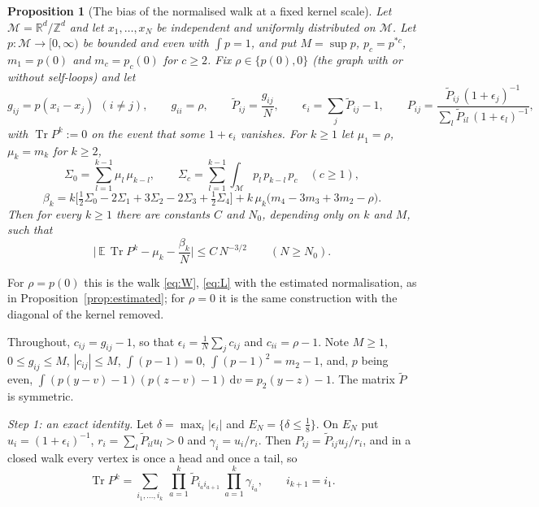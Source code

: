 \documentclass[11pt,a4paper]{article}
\makeatletter
\theoremstyle{stmt}
\newtheorem{proposition}[theorem]{Proposition}
\theoremstyle{defn}
\theoremstyle{rmk}
\renewenvironment{proof}[1][\proofname]{\par\pushQED{\qed}\normalfont\topsep6\p@\@plus6\p@\relax
  \trivlist\item[\hskip\labelsep{\sffamily\itshape\small #1.}]\ignorespaces}{\popQED\endtrivlist\@endpefalse}
\numberwithin{equation}{section}
\DeclareMathOperator{\Tr}{Tr}
\newcommand{\M}{\mathcal{M}}
\newcommand{\R}{\mathbb{R}}
\newcommand{\dd}{\mathrm{d}}
\makeatother
\begin{document}
{\begin{proposition}[The bias of the normalised walk at a fixed kernel scale]\label{prop:bias}
Let $\M=\R^d/\mathbb Z^d$ and let $x_1,\dots,x_N$ be independent and uniformly distributed on $\M$. Let $p\colon\M\to[0,\infty)$ be bounded and even with $\int p=1$, and put $M=\sup p$, $p_c=p^{*c}$, $m_1=p(0)$ and $m_c=p_c(0)$ for $c\ge2$. Fix $\rho\in\{p(0),0\}$ (the graph with or without self-loops) and let
\[
g_{ij}=p(x_i-x_j)\ \ (i\ne j),\qquad g_{ii}=\rho,\qquad\tilde P_{ij}=\frac{g_{ij}}N,\qquad\epsilon_i=\sum_j\tilde P_{ij}-1,\qquad P_{ij}=\frac{\tilde P_{ij}\,(1+\epsilon_j)^{-1}}{\sum_l\tilde P_{il}\,(1+\epsilon_l)^{-1}},
\]
with $\Tr P^k:=0$ on the event that some $1+\epsilon_i$ vanishes. For $k\ge1$ let $\mu_1=\rho$, $\mu_k=m_k$ for $k\ge2$,
\[
\Sigma_0=\sum_{l=1}^{k-1}\mu_l\,\mu_{k-l},\qquad\Sigma_c=\sum_{l=1}^{k-1}\int_\M p_l\,p_{k-l}\,p_c\quad(c\ge1),
\]
\[
\beta_k=k\Big[\tfrac12\Sigma_0-2\Sigma_1+3\Sigma_2-2\Sigma_3+\tfrac12\Sigma_4\Big]+k\,\mu_k\big(m_4-3m_3+3m_2-\rho\big).
\]
Then for every $k\ge1$ there are constants $C$ and $N_0$, depending only on $k$ and $M$, such that
\[
\Big|\,\mathbb E\,\Tr P^k-\mu_k-\frac{\beta_k}{N}\Big|\le C\,N^{-3/2}\qquad(N\ge N_0).
\]
\end{proposition}

For $\rho=p(0)$ this is the walk \eqref{eq:W}, \eqref{eq:L} with the estimated normalisation, as in Proposition~\ref{prop:estimated}; for $\rho=0$ it is the same construction with the diagonal of the kernel removed.

\begin{proof}
Throughout, $c_{ij}=g_{ij}-1$, so that $\epsilon_i=\frac1N\sum_jc_{ij}$ and $c_{ii}=\rho-1$. Note $M\ge1$, $0\le g_{ij}\le M$, $|c_{ij}|\le M$, $\int(p-1)=0$, $\int(p-1)^2=m_2-1$, and, $p$ being even, $\int(p(y-v)-1)(p(z-v)-1)\,\dd v=p_2(y-z)-1$. The matrix $\tilde P$ is symmetric.

\emph{Step 1: an exact identity.} Let $\delta=\max_i|\epsilon_i|$ and $E_N=\{\delta\le\frac18\}$. On $E_N$ put $u_i=(1+\epsilon_i)^{-1}$, $r_i=\sum_l\tilde P_{il}u_l>0$ and $\gamma_i=u_i/r_i$. Then $P_{ij}=\tilde P_{ij}u_j/r_i$, and in a closed walk every vertex is once a head and once a tail, so
\begin{equation}\label{eq:bias-identity}
\Tr P^k=\sum_{i_1,\dots,i_k}\ \prod_{a=1}^k\tilde P_{i_ai_{a+1}}\ \prod_{a=1}^k\gamma_{i_a},\qquad i_{k+1}=i_1 .
\end{equation}


\end{proof}}
\end{document}
